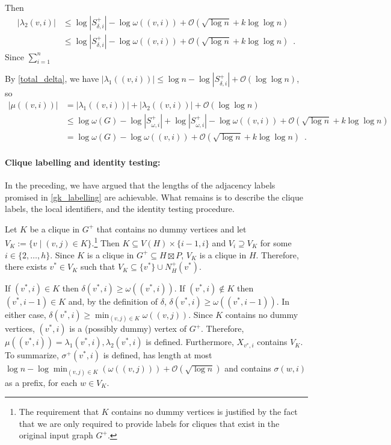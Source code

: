 \documentclass{patmorin}
\let\eqref\cref
\renewcommand{\ge}{\geqslant}
\renewcommand{\le}{\leqslant}
\DeclareMathOperator{\depth}{depth}
\newcommand{\Oh}{\mathcal{O}}
\begin{document}
  Then
  \begin{align*}
     |\lambda_2(v,i)|
     & \le \log |S^+_{\delta,i}|-\log \omega((v,i)) + \Oh(\sqrt{\log n} + k\log\log n) \\
     & \le \log |S^+_{\delta,i}|-\log \omega((v,i)) + \Oh(\sqrt{\log n} + k\log\log n) \enspace .
  \end{align*}
  Since $\sum_{i=1}^n$

  By \eqref{total_delta}, we have $|\lambda_1((v,i))|\le \log n - \log |S^+_{\delta,i}| + \Oh(\log\log n)$, so
  \begin{align*}
     |\mu((v,i))| & =
     |\lambda_1((v,i))|+|\lambda_2((v,i))| + \Oh(\log\log n) \\
     & \le \log\omega(G) - \log |S^+_{\omega,i}|
      + \log |S^+_{\omega,i}|-\log \omega((v,i)) + \Oh(\sqrt{\log n} + k\log\log n) \\
     & = \log\omega(G) - \log\omega((v,i)) + \Oh(\sqrt{\log n} + k\log\log n) \enspace .
  \end{align*}

  \paragraph{Clique labelling and identity testing:}
  In the preceding, we have argued that the lengths of the adjacency labels promised in \cref{gk_labelling} are achievable.
  What remains is to describe the clique labels, the local identifiers, and the identity testing procedure.

  Let $K$ be a clique in $G^+$ that contains no dummy vertices and let $V_K:=\{v\mid (v,j)\in K\}$.\footnote{The requirement that $K$ contains no dummy vertices is justified by the fact that we are only required to provide labels for cliques that exist in the original input graph $G^+$.}
  Then $K\subseteq V(H)\times\{i-1,i\}$  and $V_i\supseteq V_K$ for some $i\in\{2,\ldots,h\}$.  Since $K$ is a clique in $G^+\subseteq H\boxtimes P$, $V_K$ is a clique in $H$.  Therefore, there exists $v^*\in V_K$ such that $V_K\subseteq \{v^*\}\cup N^+_H(v^*)$.

  If $(v^*,i)\in K$ then $\delta(v^*,i)\ge \omega((v^*,i))$.
  If $(v^*,i)\not\in K$ then $(v^*,i-1)\in K$ and, by the definition of $\delta$, $\delta(v^*,i)\ge \omega((v^*,i-1))$.  In either case, $\delta(v^*,i)\ge\min_{(v,j)\in K}\omega((v,j))$.  Since $K$ contains no dummy vertices, $(v^*,i)$ is a (possibly dummy) vertex of $G^+$.  Therefore, $\mu((v^*,i))=\lambda_1(v^*,i),\lambda_2(v^*,i)$ is defined.  Furthermore, $X_{v^*,i}$ contains $V_K$.  To summarize, $\sigma^+(v^*,i)$ is defined, has length at most $\log n - \log\min_{(v,j)\in K}(\omega((v,j))) + \Oh(\sqrt{\log n})$ and contains $\sigma(w,i)$ as a prefix, for each $w\in V_K$.
\end{document}
